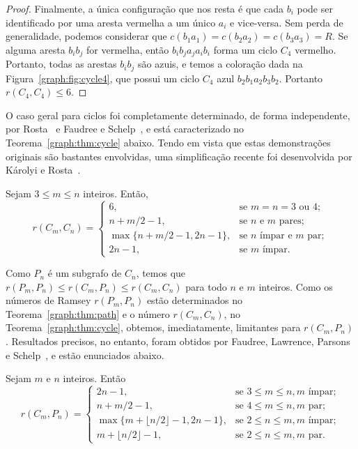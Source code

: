 \begin{proof}
Finalmente, a única configuração que nos resta é que cada $b_i$ pode ser identificado por uma aresta vermelha a um único $a_i$ e vice-versa. Sem perda de generalidade, podemos considerar que $c(b_1 a_1) = c(b_2 a_2) = c(b_3 a_3) = R$. Se alguma aresta $b_i b_j$ for vermelha, então $b_i b_j a_j a_i b_i$ forma um ciclo $C_4$ vermelho. Portanto, todas as arestas $b_i b_j$ são azuis, e temos a coloração dada na Figura~\ref{graph:fig:cycle4}, que possui um ciclo $C_4$ azul $b_2 b_1 a_2 b_3 b_2$. Portanto $r(C_4,C_4) \leq 6$.
\end{proof}

O caso geral para ciclos foi completamente determinado, de forma independente, por Rosta~\cite{rosta1973ramsey} e Faudree e Schelp~\cite{faudree1974all}, e está caracterizado no Teorema~\ref{graph:thm:cycle} abaixo. Tendo em vista que estas demonstrações originais são bastantes envolvidas, uma simplificação recente foi desenvolvida por Károlyi e Rosta~\cite{karolyi2001generalized}.

\begin{theorem}
\label{graph:thm:cycle}
Sejam $3 \leq m \leq n$ inteiros. Então,
\[r(C_m, C_n) = \begin{cases}
  6, & \text{se }m = n = 3 \text{ ou } 4;\\
  n + m/2 - 1, & \text{se }  n \text{ e } m \text{ pares}; \\
  \max\{n + m/2 - 1, 2n - 1\}, & \text{se } n \text{ ímpar e } m \text{ par};\\
  2n - 1 , & \text{se } m \text{ ímpar}.
\end{cases}\]
\end{theorem}

Como $P_n$ é um subgrafo de $C_n$, temos que $r(P_m, P_n) \leq r(C_m, P_n) \leq r(C_m, C_n)$ para todo $n$ e $m$ inteiros. Como os números de Ramsey $r(P_m, P_n)$ estão determinados no Teorema~\ref{graph:thm:path} e o número $r(C_m, C_n)$, no Teorema~\ref{graph:thm:cycle}, obtemos, imediatamente, limitantes para $r(C_m, P_n)$. Resultados precisos, no entanto, foram obtidos por Faudree, Lawrence, Parsons e Schelp~\cite{faudree1974path}, e estão enunciados abaixo.

\begin{theorem}
\label{graph:thm:pathcycle}
Sejam $m$ e $n$ inteiros. Então
\[r(C_m, P_n) = \begin{cases}
  2n - 1, & \text{se }3 \leq m \leq n, m \text{ ímpar};\\
  n + m/2 - 1, & \text{se }4 \leq m \leq n, m \text{ par}; \\
  \max\{m + \lfloor n/2 \rfloor - 1, 2n - 1\}, & \text{se } 2 \leq n \leq m, m \text{ ímpar};\\
  m + \lfloor n/2 \rfloor -1 , & \text{se } 2 \leq n \leq m, m \text{ par}.
\end{cases}\]
\end{theorem}

